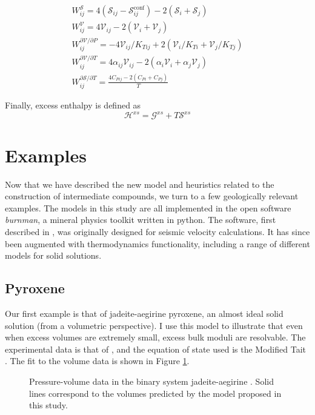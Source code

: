 \begin{eqnarray}
  W^{\mathcal{S}}_{ij} = 4 (\mathcal{S}_{ij} - \mathcal{S}^{\textrm{conf}}_{ij}) - 2(\mathcal{S}_i + \mathcal{S}_j) \\
  W^{\mathcal{V}}_{ij} = 4 \mathcal{V}_{ij} - 2(\mathcal{V}_i + \mathcal{V}_j) \\
  W^{\partial\mathcal{V}/\partial P}_{ij} = -4 \mathcal{V}_{ij}/K_{T{ij}} + 2(\mathcal{V}_{i}/K_{T{i}} + \mathcal{V}_{j}/K_{T{j}}) \\
  W^{\partial\mathcal{V}/\partial T}_{ij} = 4 \alpha_{ij} \mathcal{V}_{ij} - 2(\alpha_{i} \mathcal{V}_i + \alpha_{j} \mathcal{V}_j) \\
  W^{\partial\mathcal{S}/\partial T}_{ij} = \frac{4 C_{P{ij}} - 2(C_{P{i}} + C_{P{j}})}{T} 
\end{eqnarray}

Finally, excess enthalpy is defined as
\begin{equation}
 \mathcal{H}^{xs} = \mathcal{G}^{xs} + T\mathcal{S}^{xs}
\end{equation}


\section{Examples}
Now that we have described the new model and heuristics related to the construction of intermediate compounds, we turn to a few geologically relevant examples. The models in this study are all implemented in the open software \emph{burnman}, a mineral physics toolkit written in python. The software, first described in \cite{CHRU2014}, was originally designed for seismic velocity calculations. It has since been augmented with thermodynamics functionality, including a range of different models for solid solutions.


\subsection{Pyroxene}
Our first example is that of jadeite-aegirine pyroxene, an almost ideal solid solution (from a volumetric perspective). I use this model to illustrate that even when excess volumes are extremely small, excess bulk moduli are resolvable. The experimental data is that of \cite{NBLBT2006}, and the equation of state used is the Modified Tait \citep{HP2011}. The fit to the volume data is shown in Figure \ref{fig:PV_jadeite_aegirine}.

\begin{figure}[ht!]
  \centering
  \caption{Pressure-volume data in the binary system jadeite-aegirine \citep{NBLBT2006}. Solid lines correspond to the volumes predicted by the model proposed in this study.}
  \label{fig:PV_jadeite_aegirine}
\end{figure}

